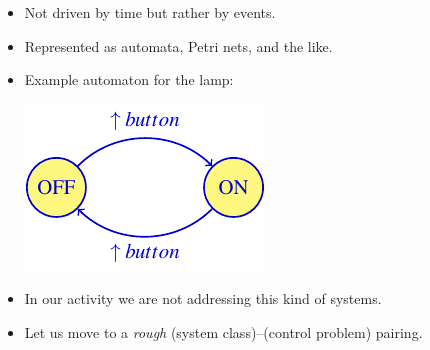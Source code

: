 \begin{frame}
\myPause
 \begin{itemize}[<+-| alert@+>]
 \item Not driven by time but rather by events.
 \item Represented as automata, Petri nets, and the like.
 \item Example automaton for the lamp:
       \begin{center}
        \includegraphics[width=0.30\columnwidth]{./Unit-01/img/DynSys-LampAutomaton.pdf}
       \end{center}
 \item In our activity we are not addressing this kind of systems.
 \item Let us move to a \emph{rough} (system class)--(control problem) pairing.
 \end{itemize}
\end{frame}

